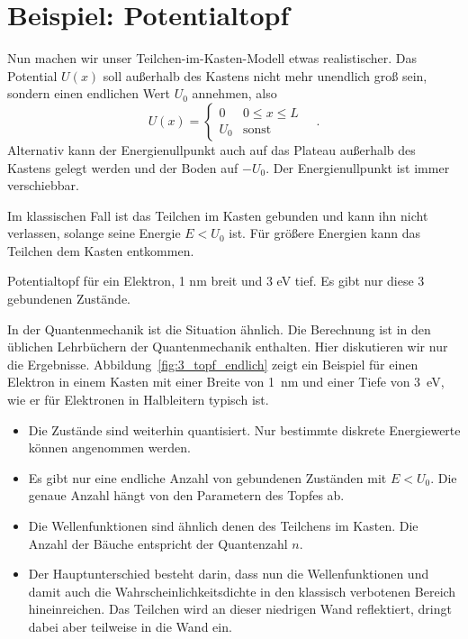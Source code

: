 \section{Beispiel: Potentialtopf}

Nun machen wir unser Teilchen-im-Kasten-Modell etwas realistischer. Das Potential $U(x)$ soll außerhalb des Kastens nicht mehr unendlich groß sein, sondern einen endlichen Wert $U_0$ annehmen, also
\begin{equation}
    U(x) = \left\{ 
        \begin{matrix}
            0 & 0 \le x \le L \\
            U_0 & \text{sonst}
        \end{matrix}
    \right. \quad .
\end{equation}
Alternativ kann der Energienullpunkt auch auf das Plateau außerhalb des Kastens gelegt werden und der Boden auf $-U_0$. Der Energienullpunkt ist immer verschiebbar.

Im klassischen Fall ist das Teilchen im Kasten gebunden und kann ihn nicht verlassen, solange seine Energie $E < U_0$ ist. Für größere Energien kann das Teilchen dem Kasten entkommen.

\begin{marginfigure}
    \caption{Potentialtopf für ein Elektron, 1 nm breit und 3 eV tief. Es gibt nur diese 3 gebundenen Zustände.}
    \label{fig:3_topf_endlich}
\end{marginfigure}

In der Quantenmechanik ist die Situation ähnlich.  Die Berechnung ist in den üblichen Lehrbüchern der Quantenmechanik enthalten. Hier diskutieren wir nur die Ergebnisse. Abbildung~\ref{fig:3_topf_endlich} zeigt ein Beispiel für einen Elektron in einem Kasten mit einer Breite von 1~nm und einer Tiefe von 3~eV, wie er für Elektronen in Halbleitern typisch ist.
\begin{itemize}\setlength{\itemsep}{0pt}
    \item Die Zustände sind weiterhin quantisiert. Nur bestimmte diskrete Energiewerte können angenommen werden.
    \item Es gibt nur eine endliche Anzahl von gebundenen Zuständen mit $E < U_0$. Die genaue Anzahl hängt von den Parametern des Topfes ab.
    \item Die Wellenfunktionen sind ähnlich denen des Teilchens im Kasten. Die Anzahl der Bäuche entspricht der Quantenzahl $n$.
    \item Der Hauptunterschied besteht darin, dass nun die Wellenfunktionen und damit auch die Wahrscheinlichkeitsdichte in den klassisch verbotenen Bereich hineinreichen. Das Teilchen wird an dieser niedrigen Wand reflektiert, dringt dabei aber teilweise in die Wand ein.
\end{itemize}

